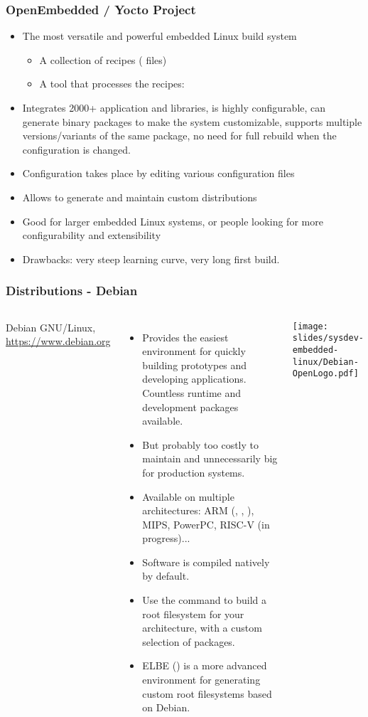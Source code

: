 \begin{frame}
  \frametitle{OpenEmbedded / Yocto Project}
  \begin{itemize}
  \item The most versatile and powerful embedded Linux build system
    \begin{itemize}
    \item A collection of recipes ( files)
    \item A tool that processes the recipes: 
    \end{itemize}
  \item Integrates 2000+ application and libraries, is highly
    configurable, can generate binary packages to make the system
    customizable, supports multiple versions/variants of the same
    package, no need for full rebuild when the configuration is
    changed.
  \item Configuration takes place by editing various configuration
    files
  \item Allows to generate and maintain custom distributions
  \item Good for larger embedded Linux systems, or people looking for
    more configurability and extensibility
  \item Drawbacks: very steep learning curve, very long first build.
  \end{itemize}
\end{frame}

\begin{frame}
  \frametitle{Distributions - Debian}
  \small
  \begin{columns}[T]
    Debian GNU/Linux, \url{https://www.debian.org}
    \begin{itemize}
    \item Provides the easiest environment for quickly building prototypes
          and developing applications. Countless runtime and
          development packages available.
    \item But probably too costly to maintain
          and unnecessarily big for production systems.
    \item Available on multiple architectures: ARM (,
          , ), MIPS, PowerPC, RISC-V (in progress)...
    \item Software is compiled natively by default.
    \item Use the  command to build a root
          filesystem for your architecture, with a custom selection
	  of packages.
    \item ELBE () is a more advanced
          environment for generating custom root filesystems
	  based on Debian.
    \end{itemize}
    \texttt{[image: slides/sysdev-embedded-linux/Debian-OpenLogo.pdf]}\\
  \end{columns}
\end{frame}

